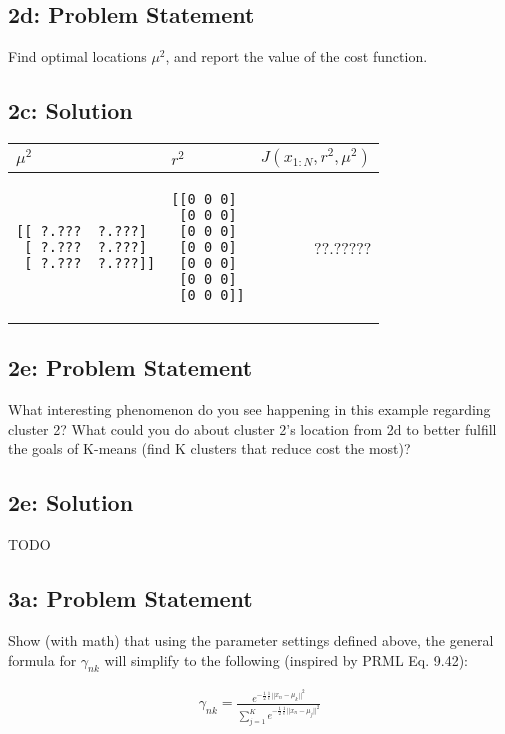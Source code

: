 \documentclass[10pt]{article}
\newcommand{\officialdirections}[1]{{\color{blue} #1}}
\begin{document}
\officialdirections{
\subsection*{2d: Problem Statement}
Find optimal locations $\mu^2$, and report the value of the cost function.
}
\subsection{2c: Solution}

\begin{tabular}{p{5cm} | p{5cm} | r}
$\mu^2$ & $r^2$ & $J(x_{1:N}, r^2, \mu^2)$
\\
\midrule
\begin{verbatim}
[[ ?.???  ?.???]
 [ ?.???  ?.???]
 [ ?.???  ?.???]]
\end{verbatim}
&	
\begin{verbatim}
[[0 0 0]
 [0 0 0]
 [0 0 0]
 [0 0 0]
 [0 0 0]
 [0 0 0]
 [0 0 0]]
\end{verbatim}
&
 ??.?????
\end{tabular}

\newpage
\officialdirections{
\subsection*{2e: Problem Statement}
What interesting phenomenon do you see happening in this example regarding cluster 2? What could you do about cluster 2's location from 2d to better fulfill the goals of K-means (find K clusters that reduce cost the most)?
}
\subsection{2e: Solution}

TODO



\newpage
\officialdirections{
\subsection*{3a: Problem Statement}
Show (with math) that using the parameter settings defined above, the general formula for $\gamma_{nk}$ will simplify to the following (inspired by PRML Eq. 9.42):

\begin{align}
	\gamma_{nk} = \frac
	{  e^{ -\frac{1}{2} \frac{1}{\epsilon} || x_n - \mu_k ||^2 } }
	{ \sum_{j=1}^K e^{ -\frac{1}{2} \frac{1}{\epsilon} || x_n - \mu_j ||^2 }}
\end{align}
}
\end{document}
